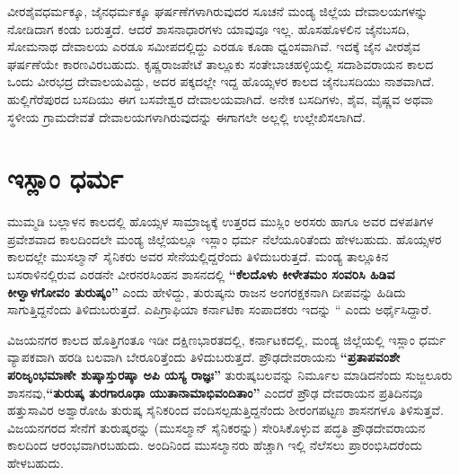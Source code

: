 \vskip -2pt

ವೀರಶೈವಧರ್ಮಕ್ಕೂ, ಜೈನಧರ್ಮಕ್ಕೂ ಘರ್ಷಣೆಗಳಾಗಿರುವುದರ ಸೂಚನೆ ಮಂಡ್ಯ ಜಿಲ್ಲೆಯ ದೇವಾಲಯಗಳನ್ನು ನೋಡಿದಾಗ ಕಂಡು ಬರುತ್ತದೆ. ಆದರೆ ಶಾಸನಾಧಾರಗಳು ಯಾವುವೂ ಇಲ್ಲ. ಹೊಸಹೊಳಲಿನ ಜೈನಬಸದಿ, ಸೋಮನಾಥ ದೇವಾಲಯ ಎರಡೂ ಸಮೀಪದಲ್ಲಿದ್ದು ಎರಡೂ ಕೂಡಾ ಧ್ವಂಸವಾಗಿವೆ. ಇದಕ್ಕೆ ಜೈನ ವೀರಶೈವ ಘರ್ಷಣೆಯೇ ಕಾರಣವಿರಬಹುದು. ಕೃಷ್ಣರಾಜಪೇಟೆ ತಾಲ್ಲೂಕು ಸಂತೇಬಾಚಹಳ್ಳಿಯಲ್ಲಿ ಸದಾಶಿವರಾಯನ ಕಾಲದ ಒಂದು ವೀರಭದ್ರ ದೇವಾಲಯವಿದ್ದು, ಅದರ ಪಕ್ಕದಲ್ಲೇ ಇದ್ದ ಹೊಯ್ಸಳರ ಕಾಲದ ಜೈನಬಸದಿಯು ನಾಶವಾಗಿದೆ. ಹುಲ್ಲಿಗೆರೆಪುರದ ಬಸದಿಯು ಈಗ ಬಸವೇಶ್ವರ ದೇವಾಲಯವಾಗಿದೆ. ಅನೇಕ ಬಸದಿಗಳು, ಶೈವ, ವೈಷ್ಣವ ಅಥವಾ ಸ್ಥಳೀಯ ಗ್ರಾಮದೇವತೆ ದೇವಾಲಯಗಳಾಗಿರುವುದನ್ನು ಈಗಾಗಲೇ ಅಲ್ಲಲ್ಲಿ ಉಲ್ಲೇಖಿಸಲಾಗಿದೆ.

\vskip -2pt

\section*{ಇಸ್ಲಾಂ ಧರ್ಮ}

\vskip -2pt

ಮುಮ್ಮಡಿ ಬಲ್ಲಾಳನ ಕಾಲದಲ್ಲಿ ಹೊಯ್ಸಳ ಸಾಮ್ರಾಜ್ಯಕ್ಕೆ ಉತ್ತರದ ಮುಸ್ಲಿಂ ಅರಸರು ಹಾಗೂ ಅವರ ದಳಪತಿಗಳ ಪ್ರವೇಶವಾದ ಕಾಲದಿಂದಲೇ ಮಂಡ್ಯ ಜಿಲ್ಲೆಯಲ್ಲೂ ಇಸ್ಲಾಂ ಧರ್ಮ ನೆಲೆಯೂರಿತೆಂದು ಹೇಳಬಹುದು. ಹೊಯ್ಸಳರ ಕಾಲದಲ್ಲೇ ಮುಸಲ್ಮಾನ್​ ಸೈನಿಕರು ಅವರ ಸೇನೆಯಲ್ಲಿದ್ದರೆಂದು ತಿಳಿದುಬರುತ್ತದೆ. ಮಂಡ್ಯ ತಾಲ್ಲೂಕಿನ ಬಸರಾಳಿನಲ್ಲಿರುವ ಎರಡನೇ ವೀರನರಸಿಂಹನ ಶಾಸನದಲ್ಲಿ \textbf{“ಕೆಲದೊಳು ಕೀಳೇತಮಂ ಸಂವರಿಸಿ ಹಿಡಿವ ಕೀಳ್ವಾಳಗೋವಂ ತುರುಷ್ಕಂ” }ಎಂದು ಹೇಳಿದ್ದು, ತುರುಷ್ಕನು ರಾಜನ ಅಂಗರಕ್ಷಕನಾಗಿ ದೀಪವನ್ನು ಹಿಡಿದು ಸಾಗುತ್ತಿದ್ದನೆಂದು ತಿಳಿದುಬರುತ್ತದೆ. ಎಪಿಗ್ರಾಫಿಯಾ ಕರ್ನಾಟಿಕಾ ಸಂಪಾದಕರು ಇದನ್ನು “  ಎಂದು ಅರ್ಥೈಸಿದ್ದಾರೆ.

\vskip -2pt

ವಿಜಯನಗರ ಕಾಲದ ಹೊತ್ತಿಗಂತೂ ಇಡೀ ದಕ್ಷಿಣಭಾರತದಲ್ಲಿ, ಕರ್ನಾಟಕದಲ್ಲಿ, ಮಂಡ್ಯ ಜಿಲ್ಲೆಯಲ್ಲಿ ಇಸ್ಲಾಂ ಧರ್ಮ ವ್ಯಾಪಕವಾಗಿ ಹರಡಿ ಬಲವಾಗಿ ಬೇರೂರಿತ್ತೆಂದು ತಿಳಿದುಬರುತ್ತದೆ. ಪ್ರೌಢದೇವರಾಯನು \textbf{“ಪ್ರತಾಪವಂಶೇ ಪರಿಜೃಂಭಮಾಣೇ ಶುಷ್ಕಾಸ್ತುರಷ್ಕಾ ಅಪಿ ಯಸ್ಯ ರಾಜ್ಞಃ”} ತುರುಷ್ಕಬಲವನ್ನು ನಿರ್ಮೂಲ ಮಾಡಿದನೆಂದು ಸುಜ್ಜಲೂರು ಶಾಸನವು,\textbf{“ತುರುಷ್ಕ ತುರಗಾರೂಢಾ ಯುತಾನಾಮಾಭಿವಂದಿತಾಂ”} ಎಂದರೆ ಪ್ರೌಢ ದೇವರಾಯನ ಪ್ರತಿದಿನವೂ ಹತ್ತುಸಾವಿರ ಅಶ್ವಾರೋಹಿ ತುರುಷ್ಕ ಸೈನಿಕರಿಂದ ವಂದಿಸಲ್ಪಡುತ್ತಿದ್ದನೆಂದು ಶೀರಂಗಪಟ್ಟಣ ಶಾಸನಗಳೂ ತಿಳಿಸುತ್ತವೆ. ವಿಜಯನಗರದ ಸೇನೆಗೆ ತುರುಷ್ಕರನ್ನು (ಮುಸಲ್ಮಾನ್​ ಸೈನಿಕರನ್ನು) ಸೇರಿಸಿಕೊಳ್ಳುವ ಪದ್ಧತಿ ಪ್ರೌಢದೇವರಾಯನ ಕಾಲದಿಂದ ಆರಂಭವಾಗಿರಬಹುದು. ಅಂದಿನಿಂದ ಮುಸಲ್ಮಾನರು ಹೆಚ್ಚಾಗಿ ಇಲ್ಲಿ ನೆಲೆಸಲು ಪ್ರಾರಂಭಿಸಿದರೆಂದು ಹೇಳಬಹುದು.

